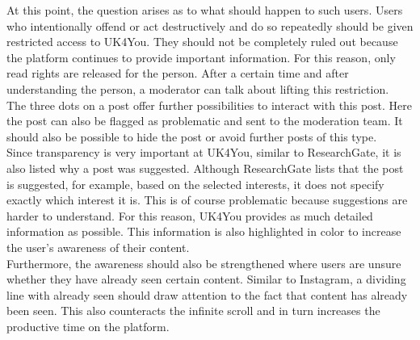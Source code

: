 At this point, the question arises as to what should happen to such users.
Users who intentionally offend or act destructively and do so repeatedly should be given restricted access to UK4You.
They should not be completely ruled out because the platform continues to provide important information.
For this reason, only read rights are released for the person.
After a certain time and after understanding the person, a moderator can talk about lifting this restriction.\\

The three dots on a post offer further possibilities to interact with this post.
Here the post can also be flagged as problematic and sent to the moderation team.
It should also be possible to hide the post or avoid further posts of this type.\\

Since transparency is very important at UK4You, similar to ResearchGate, it is also listed why a post was suggested.
Although ResearchGate lists that the post is suggested, for example, based on the selected interests, it does not specify exactly which interest it is.
This is of course problematic because suggestions are harder to understand. 
For this reason, UK4You provides as much detailed information as possible.
This information is also highlighted in color to increase the user's awareness of their content.\\

Furthermore, the awareness should also be strengthened where users are unsure whether they have already seen certain content.
Similar to Instagram, a dividing line with already seen should draw attention to the fact that content has already been seen.
This also counteracts the infinite scroll and in turn increases the productive time on the platform.\\


